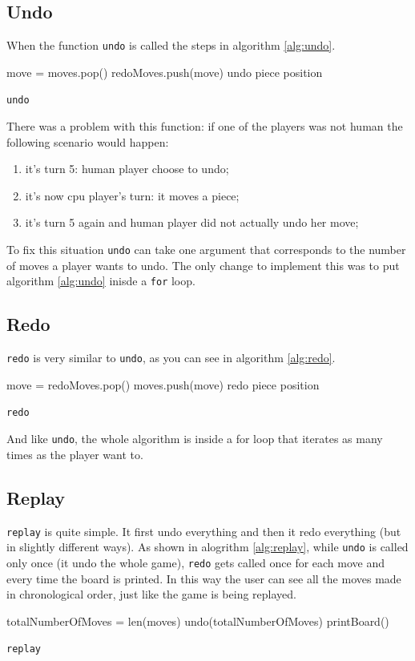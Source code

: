 \documentclass[10pt, a4paper]{article}
\begin{document}
	\subsection{Undo}
	When the function \texttt{undo} is called the steps in algorithm \ref{alg:undo}.
	\begin{algorithm}[h]
		\label{alg:undo}
		move = moves.pop()
		redoMoves.push(move)
		undo piece position
		\caption{\texttt{undo}}
	\end{algorithm}
	There was a problem with this function: if one of the players was not human the following scenario would happen:
	\begin{enumerate}
		\item it's turn 5: human player choose to undo;
		\item it's now cpu player's turn: it moves a piece;
		\item it's turn 5 again and human player did not actually undo her move;
	\end{enumerate}
	To fix this situation \texttt{undo} can take one argument that corresponds to the number of moves a player wants to undo. The only change to implement this was to put algorithm \ref{alg:undo} inisde a \texttt{for} loop.
	
	\subsection{Redo}
	\texttt{redo} is very similar to \texttt{undo}, as you can see in algorithm \ref{alg:redo}.
	\begin{algorithm}[h]
		\label{alg:redo}
		move = redoMoves.pop()
		moves.push(move)
		redo piece position
		\caption{\texttt{redo}}
	\end{algorithm}
	And like \texttt{undo}, the whole algorithm is inside a for loop that iterates as many times as the player want to.
	
	\subsection{Replay}
	\texttt{replay} is quite simple. It first undo everything and then it redo everything (but in slightly different ways). As shown in alogrithm \ref{alg:replay}, while \texttt{undo} is called only once (it undo the whole game), \texttt{redo} gets called once for each move and every time the board is printed. In this way the user can see all the moves made in chronological order, just like the game is being replayed.
	\begin{algorithm}[h]
		\label{alg:replay}
		totalNumberOfMoves = len(moves)
		undo(totalNumberOfMoves)
		printBoard()
		\caption{\texttt{replay}}
	\end{algorithm}
	
\end{document}
